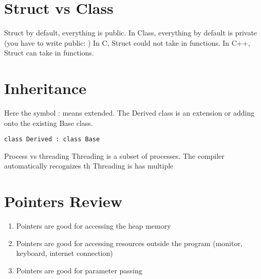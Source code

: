 \documentclass[a4paper,12pt]{book}
\begin{document}
\section{Struct vs Class}
Struct by default, everything is public. In Class, everything by default is private (you have to write public: )
In C, Struct could not take in functions. In C++, Struct can take in functions.



\section{Inheritance}

Here the symbol : means extended. The Derived class is an extension or adding onto the existing Base class.
\begin{lstlisting}
class Derived : class Base
\end{lstlisting}






Process vs threading
Threading is a subset of processes.
The compiler automatically recognizes th
Threading is has multiple 




\section{Pointers Review}
\begin{enumerate}
	\item Pointers are good for accessing the heap memory
	\item Pointers are good for accessing resources outside the program (monitor, keyboard, internet connection)
	\item Pointers are good for parameter passing
\end{enumerate}
\end{document}
